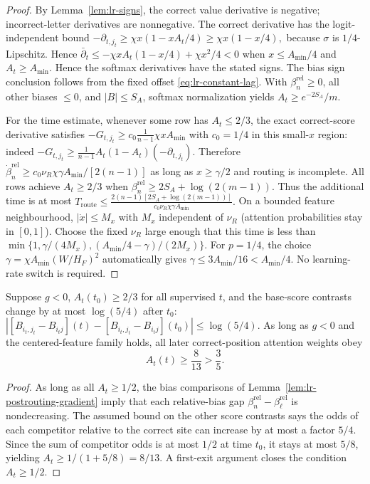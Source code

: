 \begin{proof}
By Lemma~\ref{lem:lr-signs}, the correct value derivative is negative;
incorrect-letter derivatives are nonnegative.  The correct derivative has the logit-independent bound
 $-\partial_{t,j_t}\ge\chi x(1-xA_t/4)\ge\chi x(1-x/4),$ 
because $\sigma$ is $1/4$-Lipschitz. Hence
 $\bar\partial_t\le-\chi x A_t(1-x/4)+\chi x^2/4<0$ 
when $x\le A_{\min}/4$ and $A_t\ge A_{\min}$.  Hence the softmax derivatives have the stated signs.
The bias sign conclusion follows from the fixed offset
\eqref{eq:lr-constant-lag}.
With $\beta_n^{\mathrm{rel}}\ge0$, all other biases $\le0$,
and $|B|\le S_A$, softmax normalization yields
$A_t\ge e^{-2S_A}/m$.

For the time estimate, whenever some row has $A_t\le2/3$, the exact
correct-score derivative satisfies
$-G_{t,j_t}\ge c_0\frac1{n-1}\chi xA_{\min}$
with $c_0=1/4$ in this small-$x$ region: indeed
$-G_{t,j_t}\ge\frac1{n-1} A_t(1-A_t)(-\partial_{t,j_t})$.
Therefore
$\dot\beta_n^{\mathrm{rel}}
\ge c_0\nu_R\chi\gamma A_{\min}/[2(n-1)]$
as long as $x\ge\gamma/2$ and routing is incomplete.
All rows achieve $A_t\ge2/3$ when
$\beta_n^{\mathrm{rel}}\ge
2S_A+\log(2(m-1))$.
Thus the additional time is at most
 $T_{\mathrm{route}} \le \frac{2(n-1)[2S_A+\log(2(m-1))]} {c_0\nu_R\chi\gamma A_{\min}}.$ 
On a bounded feature neighbourhood, $|\dot x|\le M_x$ with $M_x$
independent of $\nu_R$ (attention probabilities stay in $[0,1]$).
Choose the fixed $\nu_R$ large enough that this time is less than
$\min\{1,\gamma/(4M_x),(A_{\min}/4-\gamma)/(2M_x)\}$.
For $p=1/4$, the choice $\gamma=\chi A_{\min}(W/H_F)^2$
automatically gives $\gamma\le3A_{\min}/16<A_{\min}/4$.
No learning-rate switch is required.
\end{proof}

\begin{lrlemma}
\label{lem:lr-post-routing}
Suppose $g<0$, $A_t(t_0)\ge2/3$ for all supervised $t$, and the
base-score contrasts change by at most $\log(5/4)$ after $t_0$:
 $|[B_{i_t,j_t}-B_{i_tj}](t)-[B_{i_t,j_t}-B_{i_tj}](t_0)| \le\log(5/4).$ 
As long as $g<0$ and the centered-feature family holds, all later
correct-position attention weights obey
\begin{equation}\label{eq:lr-post-floor}
 A_t(t)\ge\frac8{13}>\frac35.
\end{equation}
\end{lrlemma}
\begin{proof}
As long as all $A_t\ge1/2$, the bias comparisons of
Lemma~\ref{lem:lr-postrouting-gradient} imply that each relative-bias
gap $\beta_n^{\mathrm{rel}}-\beta_\ell^{\mathrm{rel}}$ is
nondecreasing.  The assumed bound on the other score contrasts says
the odds of each competitor relative to the correct site can increase
by at most a factor $5/4$.  Since the sum of competitor odds is at most
$1/2$ at time $t_0$, it stays at most $5/8$, yielding
$A_t\ge1/(1+5/8)=8/13$.  A first-exit argument closes the condition
$A_t\ge1/2$.
\end{proof}

